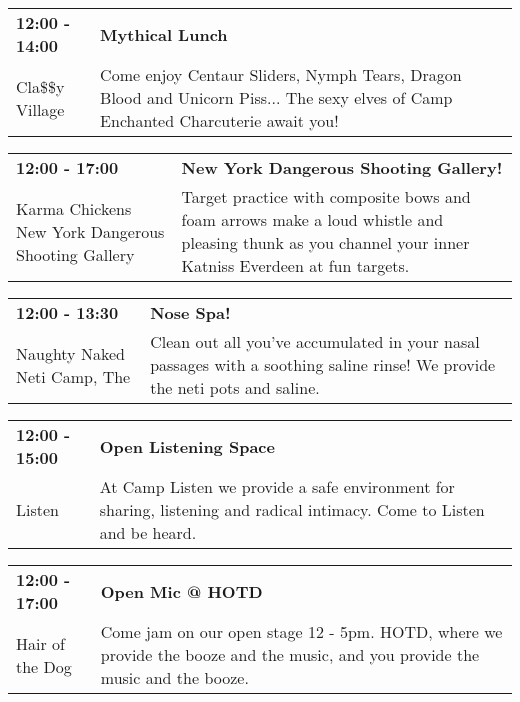 \begin{tabular}{ p{1in} p{2.2in} }
    \textbf{12:00 - 14:00} & \textbf{Mythical Lunch} \\
    Cla\$\$y Village \newline  & Come enjoy Centaur Sliders, Nymph Tears, Dragon Blood and Unicorn Piss... The sexy elves of Camp Enchanted Charcuterie await you! \\
    \hline 
\end{tabular}
    
\begin{tabular}{ p{1in} p{2.2in} }
    \textbf{12:00 - 17:00} & \textbf{New York Dangerous Shooting Gallery!} \\
    Karma Chickens \newline New York Dangerous Shooting Gallery & Target practice with composite bows and foam arrows make a loud whistle and pleasing thunk as you channel your inner Katniss Everdeen at fun targets. \\
    \hline 
\end{tabular}
    
\begin{tabular}{ p{1in} p{2.2in} }
    \textbf{12:00 - 13:30} & \textbf{Nose Spa! } \\
    Naughty Naked Neti Camp, The \newline  & Clean out all you've accumulated in your nasal passages with a soothing saline rinse! We provide the neti pots and saline. \\
    \hline 
\end{tabular}
    
\begin{tabular}{ p{1in} p{2.2in} }
    \textbf{12:00 - 15:00} & \textbf{Open Listening Space} \\
    Listen \newline  & At Camp Listen we provide a safe environment for sharing, listening and radical intimacy. Come to Listen and be heard. \\
    \hline 
\end{tabular}
    
\begin{tabular}{ p{1in} p{2.2in} }
    \textbf{12:00 - 17:00} & \textbf{Open Mic @ HOTD} \\
    Hair of the Dog \newline  & Come jam on our open stage 12 - 5pm. HOTD, where we provide the booze and the music, and you provide the music and the booze. \\
    \hline 
\end{tabular}
    
